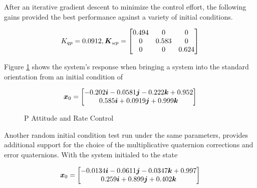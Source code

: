 After an iterative gradient descent to minimize the control effort, the following gains provided the best performance against a variety of initial conditions.

\begin{equation}
  K_{qp} = 0.0912, \boldsymbol{K}_{\omega p} = \begin{bmatrix} 0.494 & 0 & 0 \\ 0 & 0.583 & 0 \\ 0 & 0 & 0.624 \end{bmatrix}
\end{equation}

Figure \ref{fig:PAttitudeRateControl} shows the system's response when bringing a system into the standard orientation from an initial condition of

\begin{equation}
  \boldsymbol{x}_0 = \begin{bmatrix} -0.202 \boldsymbol{i} -0.0581 \boldsymbol{j} -0.222 \boldsymbol{k} +0.952 \\ 0.585 \boldsymbol{i} +0.0919 \boldsymbol{j} +0.999 \boldsymbol{k} \end{bmatrix}
\end{equation}

\begin{figure}[H]
  \centerline{}
  \caption{P Attitude and Rate Control}
  \label{fig:PAttitudeRateControl}
\end{figure}

Another random initial condition test run under the same parameters, provides additional support for the choice of the multiplicative quaternion corrections and error quaternions.  With the system initialed to the state

\begin{equation}
  \boldsymbol{x}_0 = \begin{bmatrix} -0.0134 \boldsymbol{i} -0.0611 \boldsymbol{j} -0.0347 \boldsymbol{k} +0.997 \\ 0.259 \boldsymbol{i} +0.899 \boldsymbol{j} +0.402 \boldsymbol{k} \end{bmatrix}
\end{equation}

